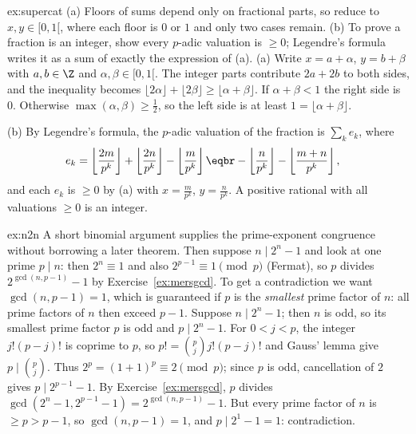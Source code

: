 \begin{solution}{ex:supercat}
\idea (a) Floors of sums depend only on fractional parts, so reduce to $x,y\in[0,1[$, where each floor is $0$ or $1$ and only two cases remain. (b) To prove a fraction is an integer, show every $p$-adic valuation is $\ge0$; Legendre's formula writes it as a sum of exactly the expression of (a).
\writeup (a) Write $x=a+\alpha$, $y=b+\beta$ with $a,b\in\Z$ and $\alpha,\beta\in[0,1[$. The integer parts contribute $2a+2b$ to both sides, and the inequality becomes $\lfloor2\alpha\rfloor+\lfloor2\beta\rfloor\ge\lfloor\alpha+\beta\rfloor$. If $\alpha+\beta<1$ the right side is $0$. Otherwise $\max(\alpha,\beta)\ge\frac12$, so the left side is at least $1=\lfloor\alpha+\beta\rfloor$.

(b) By Legendre's formula, the $p$-adic valuation of the fraction is $\sum_ke_k$, where
\[\begin{aligned}e_k&=\left\lfloor\frac{2m}{p^k}\right\rfloor+\left\lfloor\frac{2n}{p^k}\right\rfloor-\left\lfloor\frac m{p^k}\right\rfloor\eqbr-\left\lfloor\frac n{p^k}\right\rfloor-\left\lfloor\frac{m+n}{p^k}\right\rfloor,\end{aligned}\]
and each $e_k$ is $\ge0$ by (a) with $x=\frac m{p^k}$, $y=\frac n{p^k}$. A positive rational with all valuations $\ge0$ is an integer.
\end{solution}

\begin{solution}{ex:n2n}
\idea A short binomial argument supplies the prime-exponent congruence without borrowing a later theorem. Then suppose $n\mid2^n-1$ and look at one prime $p\mid n$: then $2^n\equiv1$ and also $2^{p-1}\equiv1\pmod p$ (Fermat), so $p$ divides $2^{\gcd(n,p-1)}-1$ by Exercise~\ref{ex:mersgcd}. To get a contradiction we want $\gcd(n,p-1)=1$, which is guaranteed if $p$ is the \emph{smallest} prime factor of $n$: all prime factors of $n$ then exceed $p-1$.
\writeup Suppose $n\mid2^n-1$; then $n$ is odd, so its smallest prime factor $p$ is odd and $p\mid2^n-1$. For $0<j<p$, the integer $j!(p-j)!$ is coprime to $p$, so
$p!=\binom pj j!(p-j)!$ and Gauss' lemma give $p\mid\binom pj$.
Thus $2^p=(1+1)^p\equiv2\pmod p$; since $p$ is odd, cancellation
of $2$ gives $p\mid2^{p-1}-1$. By Exercise~\ref{ex:mersgcd}, $p$ divides $\gcd(2^n-1,2^{p-1}-1)=2^{\gcd(n,p-1)}-1$. But every prime factor of $n$ is $\ge p>p-1$, so $\gcd(n,p-1)=1$, and $p\mid2^1-1=1$: contradiction.
\end{solution}

